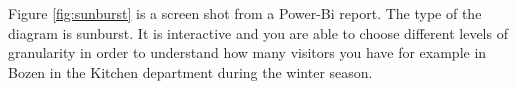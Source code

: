 \documentclass[letterpaper,12pt]{article}
\begin{document}
Figure \ref{fig:sunburst} is a screen shot from a Power-Bi report. The type of the diagram is sunburst. It is interactive and you are able to choose different levels of granularity in order to understand how many visitors you have for example in Bozen in the Kitchen department during the winter season.
\end{document}
